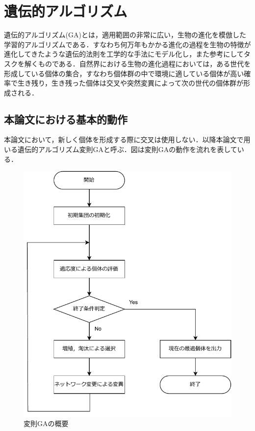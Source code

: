 \section{遺伝的アルゴリズム}
遺伝的アルゴリズム(GA)とは，適用範囲の非常に広い，生物の進化を模倣した学習的アルゴリズムである\cite{遺伝的アルゴリズム}．すなわち何万年もかかる進化の過程を生物の特徴が進化してきたような遺伝的法則を工学的な手法にモデル化し，また参考にしてタスクを解くものである．自然界における生物の進化過程においては，ある世代を形成している個体の集合，すなわち個体群の中で環境に適している個体が高い確率で生き残り，生き残った個体は交叉や突然変異によって次の世代の個体群が形成される．

\subsection{本論文における基本的動作}
本論文において，新しく個体を形成する際に交叉は使用しない．以降本論文で用いる遺伝的アルゴリズム変則GAと呼ぶ．図は変則GAの動作を流れを表している．

\begin{figure}[h]
    \begin{center}
        \includegraphics[scale=0.8]{img/expga.pdf}
        \caption{変則GAの概要}
    \end{center}
\end{figure}


